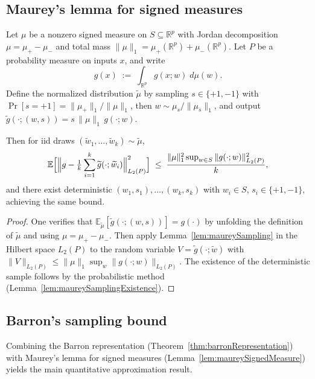 \subsection{Maurey's lemma for signed measures}

\begin{lemma}\label{lem:maureySignedMeasure}
Let $\mu$ be a nonzero signed measure on $S \subseteq \mathbb{R}^p$ with Jordan
decomposition $\mu = \mu_+ - \mu_-$ and total mass
$\|\mu\|_1 = \mu_+(\mathbb{R}^p) + \mu_-(\mathbb{R}^p)$.
Let $P$ be a probability measure on inputs $x$, and write
\[
  g(x) \;:=\; \int_{\mathbb{R}^p} g(x; w)\; d\mu(w).
\]
Define the normalized distribution $\widetilde{\mu}$ by sampling $s \in \{+1, -1\}$ with
$\Pr[s = +1] = \|\mu_+\|_1 / \|\mu\|_1$, then $w \sim \mu_s / \|\mu_s\|_1$,
and output $\widetilde{g}(\cdot; (w, s)) = s\,\|\mu\|_1\, g(\cdot; w)$.

Then for iid draws $(\widetilde{w}_1, \ldots, \widetilde{w}_k) \sim \widetilde{\mu}$,
\[
  \mathbb{E}\Bigl[\Bigl\|g - \tfrac{1}{k}\sum_{i=1}^k \widetilde{g}(\cdot;\widetilde{w}_i)
    \Bigr\|_{L_2(P)}^2\Bigr]
  \;\le\; \frac{\|\mu\|_1^2 \sup_{w \in S} \|g(\cdot; w)\|_{L_2(P)}^2}{k},
\]
and there exist deterministic $(w_1, s_1), \ldots, (w_k, s_k)$ with $w_i \in S$,
$s_i \in \{+1,-1\}$, achieving the same bound.
\end{lemma}

\begin{proof}
One verifies that $\mathbb{E}_{\widetilde{\mu}}[\widetilde{g}(\cdot;(w,s))] = g(\cdot)$
by unfolding the definition of $\widetilde{\mu}$ and using $\mu = \mu_+ - \mu_-$.
Then apply Lemma~\ref{lem:maureySampling} in the Hilbert space $L_2(P)$ to the random
variable $V = \widetilde{g}(\cdot;\widetilde{w})$ with
$\|V\|_{L_2(P)} \le \|\mu\|_1 \sup_w \|g(\cdot;w)\|_{L_2(P)}$.
The existence of the deterministic sample follows by the probabilistic method
(Lemma~\ref{lem:maureySamplingExistence}).
\end{proof}

\subsection{Barron's sampling bound}

Combining the Barron representation (Theorem~\ref{thm:barronRepresentation}) with
Maurey's lemma for signed measures (Lemma~\ref{lem:maureySignedMeasure}) yields the
main quantitative approximation result.


